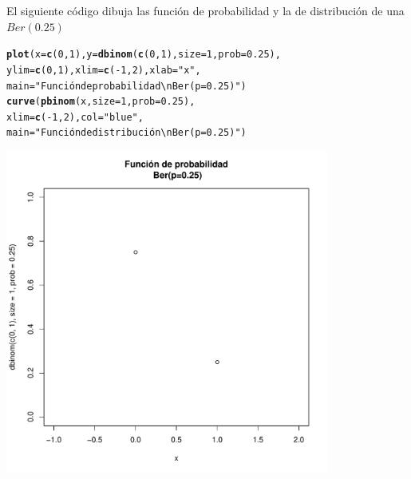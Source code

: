 \documentclass[handout]{beamer}\usepackage[]{graphicx}\usepackage[]{color}
\makeatletter
\newcommand{\hlnum}[1]{\textcolor[rgb]{0.686,0.059,0.569}{#1}}%
\newcommand{\hlstr}[1]{\textcolor[rgb]{0.192,0.494,0.8}{#1}}%
\newcommand{\hlopt}[1]{\textcolor[rgb]{0,0,0}{#1}}%
\newcommand{\hlstd}[1]{\textcolor[rgb]{0.345,0.345,0.345}{#1}}%
\newcommand{\hlkwc}[1]{\textcolor[rgb]{0.333,0.667,0.333}{#1}}%
\newcommand{\hlkwd}[1]{\textcolor[rgb]{0.737,0.353,0.396}{\textbf{#1}}}%
\newenvironment{kframe}{%
 \def\at@end@of@kframe{}%
 \ifinner\ifhmode%
  \def\at@end@of@kframe{\end{minipage}}%
  \begin{minipage}{\columnwidth}%
 \fi\fi%
 \def\FrameCommand##1{\hskip\@totalleftmargin \hskip-\fboxsep
 \colorbox{shadecolor}{##1}\hskip-\fboxsep
     \hskip-\linewidth \hskip-\@totalleftmargin \hskip\columnwidth}%
 \MakeFramed {\advance\hsize-\width
   \@totalleftmargin\z@ \linewidth\hsize
   \@setminipage}}%
 {\par\unskip\endMakeFramed%
 \at@end@of@kframe}
\newenvironment{knitrout}{}{} %
\theoremstyle{plain}
\theoremstyle{definition}
\makeatother
\begin{document}
\begin{frame}[fragile]

El siguiente código dibuja las función de probabilidad y la de distribución de una  $Ber(0.25)$

\begin{knitrout}
\color{fgcolor}\begin{kframe}
\begin{alltt}
\hlkwd{plot}\hlstd{(}\hlkwc{x}\hlstd{=}\hlkwd{c}\hlstd{(}\hlnum{0}\hlstd{,}\hlnum{1}\hlstd{),}\hlkwc{y}\hlstd{=}\hlkwd{dbinom}\hlstd{(}\hlkwd{c}\hlstd{(}\hlnum{0}\hlstd{,}\hlnum{1}\hlstd{),}\hlkwc{size}\hlstd{=}\hlnum{1}\hlstd{,}\hlkwc{prob}\hlstd{=}\hlnum{0.25}\hlstd{),}
    \hlkwc{ylim}\hlstd{=}\hlkwd{c}\hlstd{(}\hlnum{0}\hlstd{,}\hlnum{1}\hlstd{),}\hlkwc{xlim}\hlstd{=}\hlkwd{c}\hlstd{(}\hlopt{-}\hlnum{1}\hlstd{,}\hlnum{2}\hlstd{),}\hlkwc{xlab}\hlstd{=}\hlstr{"x"}\hlstd{,}
    \hlkwc{main}\hlstd{=}\hlstr{"Función de probabilidad\textbackslash{}n Ber(p=0.25)"}\hlstd{)}
\hlkwd{curve}\hlstd{(}\hlkwd{pbinom}\hlstd{(x,}\hlkwc{size}\hlstd{=}\hlnum{1}\hlstd{,}\hlkwc{prob}\hlstd{=}\hlnum{0.25}\hlstd{),}
    \hlkwc{xlim}\hlstd{=}\hlkwd{c}\hlstd{(}\hlopt{-}\hlnum{1}\hlstd{,}\hlnum{2}\hlstd{),}\hlkwc{col}\hlstd{=}\hlstr{"blue"}\hlstd{,}
    \hlkwc{main}\hlstd{=}\hlstr{"Función de distribución\textbackslash{}n Ber(p=0.25)"}\hlstd{)}
\end{alltt}
\end{kframe}
\end{knitrout}

\end{frame}


\begin{frame}[fragile]

\begin{knitrout}
\color{fgcolor}
\includegraphics[width=0.8\textwidth]{figure/unnamed-chunk-2-1} 

\end{knitrout}

\end{frame}
\end{document}
